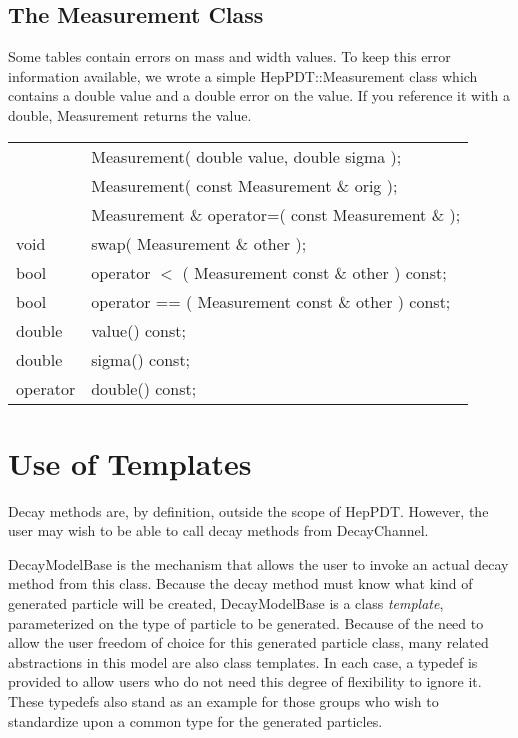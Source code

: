 \subsection{ The Measurement Class }

Some tables contain errors on mass and width values.
To keep this error information available, we wrote a simple HepPDT::Measurement
class which contains a double value and a double error on the value.
If you reference it with a double, Measurement returns the value.

\begin{center}
\begin{tabular}{ll}
 & Measurement( double value, double sigma ); \\
 & Measurement( const Measurement \& orig );  \\
 & Measurement \& operator=( const Measurement \& );  \\
void & swap( Measurement \& other );  \\
bool  & operator $<$  ( Measurement const \& other ) const;  \\
bool   & operator == ( Measurement const \& other ) const;  \\
   double  &  value()  const;\\
   double   & sigma()  const;\\
   operator & double() const;\\
\end{tabular}
\end{center}

\section{Use of Templates}

Decay methods are, by definition, outside the scope of 
HepPDT.  However, the user may wish to be able to call 
decay methods from DecayChannel.

DecayModelBase is the mechanism that allows
the user to invoke an actual decay method from this class.
Because the decay method must
know what kind of generated particle will be created,
DecayModelBase is a class \textit{template}, parameterized on the
type of particle to be generated. Because of the need to allow the
user freedom of choice for this generated particle class, many
related abstractions in this model are also class templates. In
each case, a typedef is provided to allow users who do not need
this degree of flexibility to ignore it. These typedefs also stand
as an example for those groups who wish to standardize upon a
common type for the generated particles.

